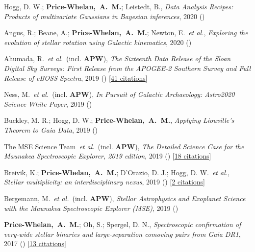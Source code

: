 \item[{\color{deemph}\scriptsize9}]Hogg, D. W.; \textbf{Price-Whelan,~A.~M.}; Leistedt, B., \textit{Data Analysis Recipes: Products of multivariate Gaussians in Bayesian inferences}, 2020 ()

\item[{\color{deemph}\scriptsize8}]Angus, R.; Beane, A.; \textbf{Price-Whelan,~A.~M.}; Newton, E.~\textit{et al.}, \textit{Exploring the evolution of stellar rotation using Galactic kinematics}, 2020 ()

\item[{\color{deemph}\scriptsize7}]Ahumada, R.~\textit{et al.}~(incl. \textbf{APW}), \textit{The Sixteenth Data Release of the Sloan Digital Sky Surveys: First Release from the APOGEE-2 Southern Survey and Full Release of eBOSS Spectra}, 2019 () [\href{http://adsabs.harvard.edu/abs/2019arXiv191202905A}{41 citations}]

\item[{\color{deemph}\scriptsize6}]Ness, M.~\textit{et al.}~(incl. \textbf{APW}), \textit{In Pursuit of Galactic Archaeology: Astro2020 Science White Paper}, 2019 ()

\item[{\color{deemph}\scriptsize5}]Buckley, M. R.; Hogg, D. W.; \textbf{Price-Whelan,~A.~M.}, \textit{Applying Liouville's Theorem to Gaia Data}, 2019 ()

\item[{\color{deemph}\scriptsize4}]The MSE Science Team~\textit{et al.}~(incl. \textbf{APW}), \textit{The Detailed Science Case for the Maunakea Spectroscopic Explorer, 2019 edition}, 2019 () [\href{http://adsabs.harvard.edu/abs/2019arXiv190404907T}{18 citations}]

\item[{\color{deemph}\scriptsize3}]Breivik, K.; \textbf{Price-Whelan,~A.~M.}; D'Orazio, D. J.; Hogg, D. W.~\textit{et al.}, \textit{Stellar multiplicity: an interdisciplinary nexus}, 2019 () [\href{http://adsabs.harvard.edu/abs/2019arXiv190305094B}{2 citations}]

\item[{\color{deemph}\scriptsize2}]Bergemann, M.~\textit{et al.}~(incl. \textbf{APW}), \textit{Stellar Astrophysics and Exoplanet Science with the Maunakea Spectroscopic Explorer (MSE)}, 2019 ()

\item[{\color{deemph}\scriptsize1}]\textbf{Price-Whelan,~A.~M.}; Oh, S.; Spergel, D. N., \textit{Spectroscopic confirmation of very-wide stellar binaries and large-separation comoving pairs from Gaia DR1}, 2017 () [\href{http://adsabs.harvard.edu/abs/2017arXiv170903532P}{13 citations}]